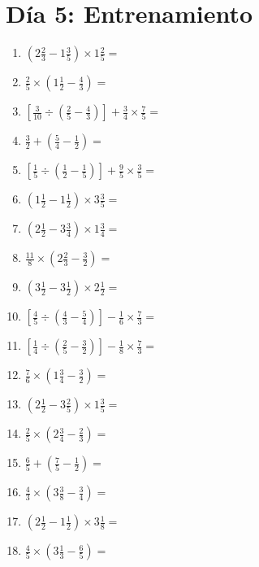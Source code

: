 \documentclass[12pt]{article}
\begin{document}
\section*{Día 5: Entrenamiento}
\begin{enumerate}[ itemsep=1.5cm]
	\item $\displaystyle \left( 2 \frac{2}{3} - 1 \frac{3}{5} \right) \times 1 \frac{2}{5} =$
	\item $\displaystyle \frac{2}{5} \times \left( 1 \frac{1}{2} - \frac{4}{3} \right) =$
	\item $\displaystyle \left[ \frac{3}{10} \div \left( \frac{2}{5} - \frac{4}{3} \right) \right] + \frac{3}{4} \times \frac{7}{5} =$
	\item $\displaystyle \frac{3}{2} + \left( \frac{5}{4} - \frac{1}{2} \right) =$
	\item $\displaystyle \left[ \frac{1}{5} \div \left( \frac{1}{2} - \frac{1}{5} \right) \right] + \frac{9}{5} \times \frac{3}{5} =$
	\item $\displaystyle \left( 1 \frac{1}{2} - 1 \frac{1}{2} \right) \times 3 \frac{3}{5} =$
	\item $\displaystyle \left( 2 \frac{1}{2} - 3 \frac{3}{4} \right) \times 1 \frac{3}{4} =$
	\item $\displaystyle \frac{11}{8} \times \left( 2 \frac{2}{3} - \frac{3}{2} \right) =$
	\item $\displaystyle \left( 3 \frac{1}{2} - 3 \frac{1}{2} \right) \times 2 \frac{1}{2} =$

	\item $\displaystyle \left[ \frac{4}{5} \div \left( \frac{4}{3} - \frac{5}{4} \right) \right] - \frac{1}{6} \times \frac{7}{3} =$
	\item $\displaystyle \left[ \frac{1}{4} \div \left( \frac{2}{5} - \frac{3}{2} \right) \right] - \frac{1}{8} \times \frac{7}{3} =$
	\item $\displaystyle \frac{7}{6} \times \left( 1 \frac{3}{4} - \frac{3}{2} \right) =$
	\item $\displaystyle \left( 2 \frac{1}{2} - 3 \frac{2}{5} \right) \times 1 \frac{3}{5} =$
	\item $\displaystyle \frac{2}{5} \times \left( 2 \frac{3}{4} - \frac{2}{3} \right) =$
	\item $\displaystyle \frac{6}{5} + \left( \frac{7}{5} - \frac{1}{2} \right) =$
	\item $\displaystyle \frac{4}{3} \times \left( 3 \frac{3}{8} - \frac{3}{4} \right) =$
	\item $\displaystyle \left( 2 \frac{1}{2} - 1 \frac{1}{2} \right) \times 3 \frac{1}{8} =$
	\item $\displaystyle \frac{4}{5} \times \left( 3 \frac{1}{3} - \frac{6}{5} \right) =$


\end{enumerate}
\end{document}
